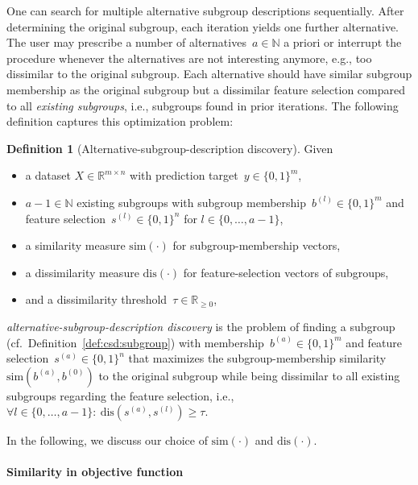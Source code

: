 \documentclass{article}
\theoremstyle{definition}
\newtheorem{definition}{Definition}
\begin{document}
One can search for multiple alternative subgroup descriptions sequentially.
After determining the original subgroup, each iteration yields one further alternative.
The user may prescribe a number of alternatives~$a \in \mathbb{N}$ a priori or interrupt the procedure whenever the alternatives are not interesting anymore, e.g., too dissimilar to the original subgroup.
Each alternative should have similar subgroup membership as the original subgroup but a dissimilar feature selection compared to all \emph{existing subgroups}, i.e., subgroups found in prior iterations.
The following definition captures this optimization problem:
%
\begin{definition}[Alternative-subgroup-description discovery]
	Given
	\begin{itemize}[noitemsep]
		\item a dataset $X \in \mathbb{R}^{m \times n}$ with prediction target~$y \in \{0, 1\}^m$,
		\item $a-1 \in \mathbb{N}$ existing subgroups with subgroup membership~$b^{(l)} \in \{0, 1\}^m$ and feature selection~$s^{(l)} \in \{0, 1\}^n$ for $l \in \{0, \dots, a - 1\}$,
		\item a similarity measure $\text{sim}(\cdot)$ for subgroup-membership vectors,
		\item a dissimilarity measure $\text{dis}(\cdot)$ for feature-selection vectors of subgroups,
		\item and a dissimilarity threshold~$\tau \in \mathbb{R}_{\geq 0}$,
	\end{itemize}
	\emph{alternative-subgroup-description discovery} is the problem of finding a subgroup (cf.~Definition~\ref{def:csd:subgroup}) with membership~$b^{(a)} \in \{0, 1\}^m$ and feature selection~$s^{(a)} \in \{0, 1\}^n$ that maximizes the subgroup-membership similarity $\text{sim}(b^{(a)}, b^{(0)})$ to the original subgroup while being dissimilar to all existing subgroups regarding the feature selection, i.e., $\forall l \in \{0, \dots, a-1\}:~\text{dis}(s^{(a)}, s^{(l)}) \geq \tau$.
	\label{def:csd:alternative-subgroup-description-discovery}
\end{definition}
%
In the following, we discuss our choice of $\text{sim}(\cdot)$ and $\text{dis}(\cdot)$.

\paragraph{Similarity in objective function}
\end{document}
